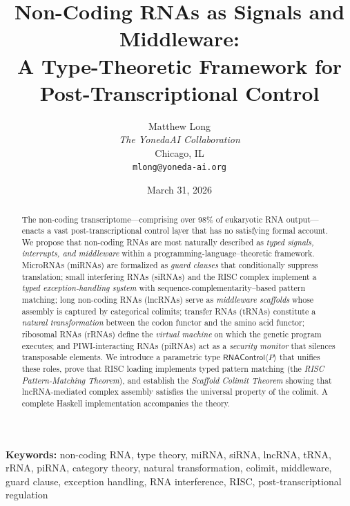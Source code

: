 \documentclass[12pt,a4paper]{article}
\theoremstyle{definition}
\newcommand{\RNAType}{\mathsf{RNAControl}}
\begin{document}
\title{\textbf{Non-Coding RNAs as Signals and Middleware:\\
A Type-Theoretic Framework for Post-Transcriptional Control}}

\author{
  Matthew Long \\
  \textit{The YonedaAI Collaboration} \\
  Chicago, IL \\
  \texttt{mlong@yoneda-ai.org}
}

\date{March 31, 2026}

\maketitle

\begin{abstract}
\noindent
The non-coding transcriptome---comprising over 98\% of eukaryotic RNA
output---enacts a vast post-transcriptional control layer that has no
satisfying formal account.  We propose that non-coding RNAs are most
naturally described as \emph{typed signals, interrupts, and middleware}
within a programming-language--theoretic framework.  MicroRNAs (miRNAs)
are formalized as \emph{guard clauses} that conditionally suppress
translation; small interfering RNAs (siRNAs) and the RISC complex
implement a \emph{typed exception-handling system} with
sequence-complementarity--based pattern matching; long non-coding RNAs
(lncRNAs) serve as \emph{middleware scaffolds} whose assembly is
captured by categorical colimits; transfer RNAs (tRNAs) constitute a
\emph{natural transformation} between the codon functor and the amino
acid functor; ribosomal RNAs (rRNAs) define the \emph{virtual machine}
on which the genetic program executes; and PIWI-interacting RNAs
(piRNAs) act as a \emph{security monitor} that silences transposable
elements.  We introduce a parametric type $\RNAType\langle P\rangle$
that unifies these roles, prove that RISC loading implements typed
pattern matching (the \emph{RISC Pattern-Matching Theorem}), and
establish the \emph{Scaffold Colimit Theorem} showing that
lncRNA-mediated complex assembly satisfies the universal property of the
colimit.  A complete Haskell implementation accompanies the theory.
\end{abstract}

\medskip
\noindent\textbf{Keywords:}
non-coding RNA, type theory, miRNA, siRNA, lncRNA, tRNA, rRNA, piRNA,
category theory, natural transformation, colimit, middleware, guard clause,
exception handling, RNA interference, RISC, post-transcriptional regulation
\end{document}
